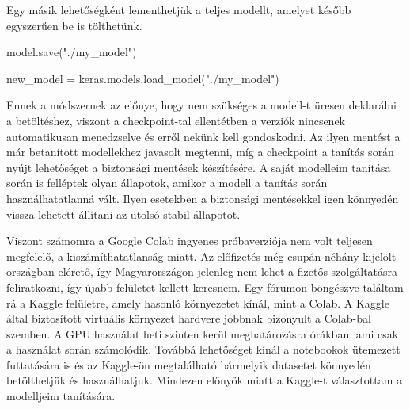 Egy másik lehetőségként lementhetjük a teljes modellt, amelyet később egyszerűen be is tölthetünk.
\begin{python}
model.save("./my_model")

new_model = keras.models.load_model("./my_model")
\end{python}
Ennek a módszernek az előnye, hogy nem szükséges a modell-t üresen deklarálni a betöltéshez, viszont a checkpoint-tal ellentétben a verziók nincsenek automatikusan menedzselve és erről nekünk kell gondoskodni. Az ilyen mentést a már betanított modellekhez javasolt megtenni, míg a checkpoint a tanítás során nyújt lehetőséget a biztonsági mentések készítésére. A saját modelleim tanítása során is felléptek olyan állapotok, amikor a modell a tanítás során használhatatlanná vált. Ilyen esetekben a biztonsági mentésekkel igen könnyedén vissza lehetett állítani az utolsó stabil állapotot.

Viszont számomra a Google Colab ingyenes próbaverziója nem volt teljesen megfelelő, a kiszámíthatatlanság miatt. Az előfizetés még csupán néhány kijelölt országban elérető, így Magyarországon jelenleg nem lehet a fizetős szolgáltatásra feliratkozni, így újabb felületet kellett keresnem.
Egy fórumon böngészve találtam rá a Kaggle \cite{kaggle} felületre, amely hasonló környezetet kínál, mint a Colab. A Kaggle által biztosított virtuális környezet hardvere jobbnak bizonyult a Colab-bal szemben. A GPU használat heti szinten kerül meghatározásra órákban, ami csak a használat során számolódik. Továbbá lehetőséget kínál a notebookok ütemezett futtatására is és az Kaggle-ön megtalálható bármelyik datasetet könnyedén betölthetjük és használhatjuk. Mindezen előnyök miatt a Kaggle-t választottam a modelljeim tanítására.

